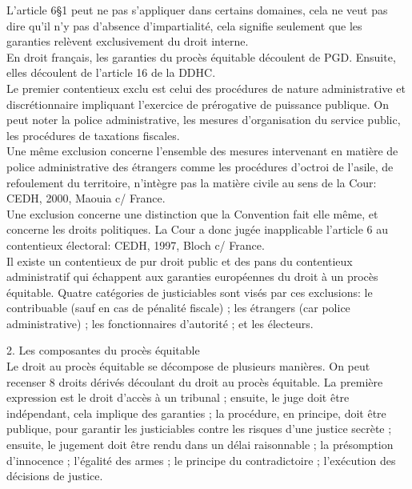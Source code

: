 \documentclass[10pt, a4paper, openany]{book}
\begin{document}
L'article 6§1 peut ne pas s'appliquer dans certains domaines, cela ne veut pas dire qu'il n'y pas d'absence d'impartialité, cela signifie seulement que les garanties relèvent exclusivement du droit interne. \\
En droit français, les garanties du procès équitable découlent de PGD. Ensuite, elles découlent de l'article 16 de la DDHC. \\
Le premier contentieux exclu est celui des procédures de nature administrative et discrétionnaire impliquant l'exercice de prérogative de puissance publique. On peut noter la police administrative, les mesures d'organisation du service public, les procédures de taxations fiscales. \\
Une même exclusion concerne l'ensemble des mesures intervenant en matière de police administrative des étrangers comme les procédures d'octroi de l'asile, de refoulement du territoire, n'intègre pas la matière civile au sens de la Cour: CEDH, 2000, Maouia c/ France. \\
Une exclusion concerne une distinction que la Convention fait elle même, et concerne les droits politiques. La Cour a donc jugée inapplicable l'article 6 au contentieux électoral: CEDH, 1997, Bloch c/ France. \\
Il existe un contentieux de pur droit public et des pans du contentieux administratif qui échappent aux garanties européennes du droit à un procès équitable. Quatre catégories de justiciables sont visés par ces exclusions: le contribuable (sauf en cas de pénalité fiscale) ; les étrangers (car police administrative) ; les fonctionnaires d'autorité ; et les électeurs. 


2. Les composantes du procès équitable \\
Le droit au procès équitable se décompose de plusieurs manières. On peut recenser 8 droits dérivés découlant du droit au procès équitable. La première expression est le droit d'accès à un tribunal ; ensuite, le juge doit être indépendant, cela implique des garanties ; la procédure, en principe, doit être publique, pour garantir les justiciables contre les risques d'une justice secrète ; ensuite, le jugement doit être rendu dans un délai raisonnable ; la présomption d'innocence ; l'égalité des armes ; le principe du contradictoire ; l'exécution des décisions de justice.
\end{document}
